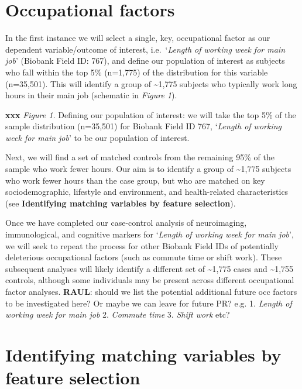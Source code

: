\documentclass[
]{article}
\begin{document}
\hypertarget{occupational-factors}{%
\section{Occupational factors}\label{occupational-factors}}

In the first instance we will select a single, key, occupational factor
as our dependent variable/outcome of interest, i.e.~`\emph{Length of
working week for main job}' (Biobank Field ID: 767), and define our
population of interest as subjects who fall within the top 5\% (n=1,775)
of the distribution for this variable (n=35,501). This will identify a
group of \textasciitilde1,775 subjects who typically work long hours in
their main job (schematic in \emph{Figure 1}).

\textbf{xxx} \emph{Figure 1.} Defining our population of interest: we
will take the top 5\% of the sample distribution (n=35,501) for Biobank
Field ID 767, `\emph{Length of working week for main job}' to be our
population of interest.

Next, we will find a set of matched controls from the remaining 95\% of
the sample who work fewer hours. Our aim is to identify a group of
\textasciitilde1,775 subjects who work fewer hours than the case group,
but who are matched on key sociodemographic, lifestyle and environment,
and health-related characteristics (see \textbf{Identifying matching
variables by feature selection}).

Once we have completed our case-control analysis of neuroimaging,
immunological, and cognitive markers for `\emph{Length of working week
for main job}', we will seek to repeat the process for other Biobank
Field IDs of potentially deleterious occupational factors (such as
commute time or shift work). These subsequent analyses will likely
identify a different set of \textasciitilde1,775 cases and
\textasciitilde1,755 controls, although some individuals may be present
across different occupational factor analyses. \textbf{RAUL}: should we
list the potential additional future occ factors to be investigated
here? Or maybe we can leave for future PR? e.g. 1. \emph{Length of
working week for main job} 2. \emph{Commute time} 3. \emph{Shift work}
etc?

\hypertarget{identifying-matching-variables-by-feature-selection}{%
\section{Identifying matching variables by feature
selection}\label{identifying-matching-variables-by-feature-selection}}
\end{document}
